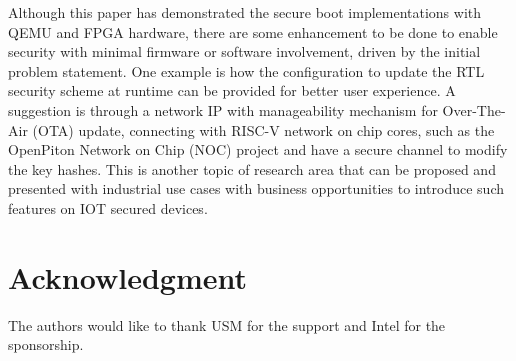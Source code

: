 \documentclass[a4paper,fleqn]{cas-dc}
\begin{document}
Although this paper has demonstrated the secure boot implementations with QEMU and FPGA hardware, there are some enhancement to be done to enable security with minimal firmware or software involvement, driven by the initial problem statement. One example is how the configuration to update the RTL security scheme at runtime can be provided for better user experience. A suggestion is through a network IP with manageability mechanism for Over-The-Air (OTA) update, connecting with RISC-V network on chip cores, such as the OpenPiton Network on Chip (NOC) project and have a secure channel to modify the key hashes. This is another topic of research area that can be proposed and presented with industrial use cases with business opportunities to introduce such features on IOT secured devices.

\section*{Acknowledgment}
The authors would like to thank USM for the support and Intel for the sponsorship.

 


\vskip6pt
\end{document}

